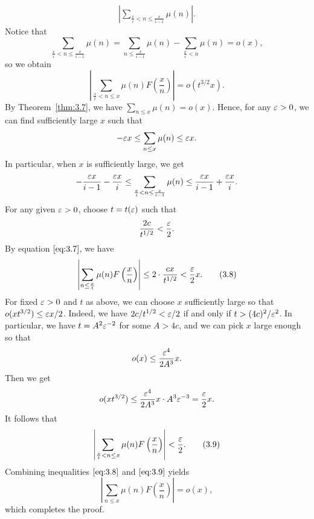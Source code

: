 \begin{pf}
\begin{align*}
        \left| \sum_{\frac xi < n \leq \frac{x}{i-1}} \mu(n) \right|. 
    \end{align*}
    Notice that 
    \[ \sum_{\frac xi < n \leq \frac{x}{i-1}} \mu(n) = 
    \sum_{n \leq \frac{x}{i-1}} \mu(n) - \sum_{\frac{x}{i} < n} \mu(n) = o(x), \] 
    so we obtain 
    \[ \left| \sum_{\frac xt < n \leq x} \mu(n) F\left( \frac xn \right) \right| 
    = o(t^{3/2}x). \] 
    By Theorem~\ref{thm:3.7}, we have $\sum_{n\leq x} \mu(n) = o(x)$. Hence, 
    for any $\varepsilon > 0$, we can find sufficiently large $x$ such that 
    \[ -\varepsilon x \leq \sum_{n\leq x} \mu(n) \leq \varepsilon x. \] 
    In particular, when $x$ is sufficiently large, we get 
    \[ -\frac{\varepsilon x}{i-1} - \frac{\varepsilon x}{i} 
    \leq \sum_{\frac{x}{i} < n \leq \frac{x}{i-1}} \mu(n) 
    \leq \frac{\varepsilon x}{i-1} + \frac{\varepsilon x}{i}. \] 
    For any given $\varepsilon > 0$, choose $t = t(\varepsilon)$ such that 
    \[ \frac{2c}{t^{1/2}} < \frac{\varepsilon}2. \] 
    By equation $\eqref{eq:3.7}$, we have 
    \[ \left| \sum_{n\leq \frac{x}{t}} \mu(n) F\left( \frac xn \right) \right| 
    \leq 2 \cdot \frac{cx}{t^{1/2}} < \frac{\varepsilon}2 x. \tag{3.8}\label{eq:3.8} \] 
    For fixed $\varepsilon > 0$ and $t$ as above, we can choose $x$ sufficiently large 
    so that $o(xt^{3/2}) \leq \varepsilon x/2$. Indeed, we have 
    $2c/t^{1/2} < \varepsilon/2$ if and only if $t > (4c)^2/\varepsilon^2$. In particular, 
    we have $t = A^2\varepsilon^{-2}$ for some $A > 4c$, and we can pick $x$ large 
    enough so that 
    \[ o(x) \leq \frac{\varepsilon^4}{2A^3}x. \] 
    Then we get 
    \[ o(xt^{3/2}) \leq \frac{\varepsilon^4}{2A^3} x \cdot A^3\varepsilon^{-3} = \frac{\varepsilon}2 x. \] 
    It follows that 
    \[ \left| \sum_{\frac xt < n \leq x} \mu(n) F\left( \frac xn \right) \right| < 
    \frac{\varepsilon}2. \tag{3.9}\label{eq:3.9} \] 
    Combining inequalities $\eqref{eq:3.8}$ and $\eqref{eq:3.9}$ yields 
    \[ \left| \sum_{n\leq x} \mu(n) F\left( \frac xn \right) \right| = o(x), \] 
    which completes the proof. 
\end{pf}

